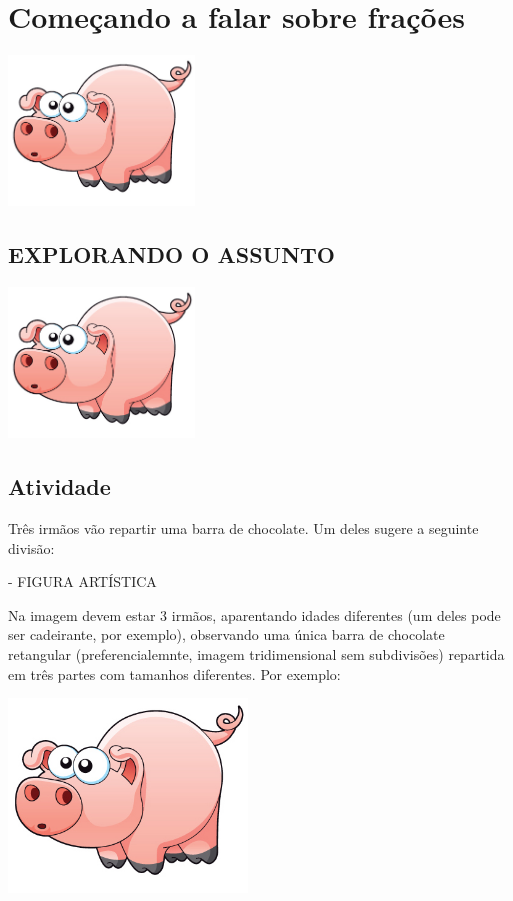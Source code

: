\documentclass[a4,12pt]{book}
\begin{document}
\chapter*{Começando a falar sobre frações}


\includegraphics[width=\textwidth,height=4cm, keepaspectratio]{pig}










\section*{ EXPLORANDO O ASSUNTO }


\includegraphics[width=\textwidth,height=4cm, keepaspectratio]{pig}
\section{Atividade}







Três irmãos vão repartir uma barra de chocolate. Um deles sugere a seguinte divisão:

\begin{imagem*}[breakable]{}{}   - FIGURA ARTÍSTICA

  Na imagem devem estar 3 irmãos, aparentando idades diferentes (um deles pode ser cadeirante, por exemplo), observando uma única barra de chocolate retangular (preferencialemnte, imagem tridimensional sem subdivisões) repartida em três partes com tamanhos diferentes. Por exemplo:

    \includegraphics[width=180pt, keepaspectratio]{pig}

\end{imagem*}
\end{document}
